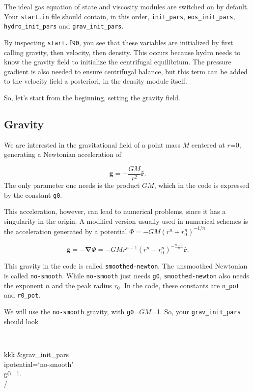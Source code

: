 \documentclass[a4paper,10pt]{article}
\renewcommand{\v}[1]{{\boldsymbol #1}} %
\newcommand{\del}{\v{\nabla}}
\newcommand{\grad}{\del}
\newcommand{\hatr}{\hat{\v{r}}}
\begin{document}
The ideal gas equation of state and viscosity modules are switched on by default. Your {\tt start.in} file should contain, in this order, {\tt init\_pars}, {\tt eos\_init\_pars}, {\tt hydro\_init\_pars} and {\tt grav\_init\_pars}.

By inspecting {\tt start.f90}, you see that these variables are initialized by first calling gravity, then velocity, then density. This occurs because hydro needs to know the gravity field to initialize the centrifugal equilibrium. The pressure gradient is also needed to ensure centrifugal balance, but this term can be added to the velocity field a posteriori, in the density module itself. 

So, let's start from the beginning, setting the gravity field.

\subsection{Gravity}

We are interested in the gravitational field of a point mass $M$ centered at $r$=$0$, generating a Newtonian acceleration of  

\begin{equation}
\v{g} = -\frac{GM}{r^2} \hatr .
\end{equation}The only parameter one needs is the product $GM$, which in the code is expressed by the constant {\tt g0}. 

This acceleration, however, can lead to numerical problems, since it has a singularity in the origin. A modified version usually used in numerical schemes is the acceleration generated by a potential $\Phi = -GM(r^n+r_0^n)^{-1/n}$

\begin{equation}
 \v{g} = -\grad{\Phi} =-GM r^{n-1} (r^n + r_0^n)^{-\frac{n+1}{n}} \hatr.
\end{equation}

This gravity in the code is called {\tt smoothed-newton}. The unsmoothed Newtonian is called {\tt no-smooth}. While {\tt no-smooth} just needs {\tt g0}, {\tt smoothed-newton} also needs the exponent $n$ and the peak radius $r_0$. In the code, these constants are {\tt n\_pot} and {\tt r0\_pot}. 

We will use the {\tt no-smooth} gravity, with {\tt g0}=$GM$=1. So, your {\tt grav\_init\_pars} should look

{\tt 
\begin{tabbing}
kkk\=\kill
\&grav\_init\_pars\\
  \>ipotential=`no-smooth'\\
  \>g0=1.\\
/
\end{tabbing}
}
\end{document}
